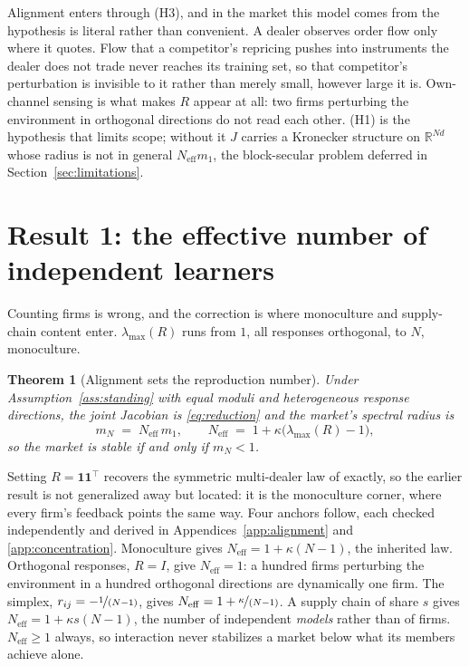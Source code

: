 \documentclass{article}
\theoremstyle{plain}
\newtheorem{theorem}{Theorem}
\theoremstyle{definition}
\newcommand{\Neff}{N_{\mathrm{eff}}}
\newcommand{\mN}{m_N}
\newcommand{\lmax}{\lambda_{\max}}
\begin{document}
Alignment enters through (H3), and in the market this model comes from the hypothesis is literal rather than convenient. A dealer observes order flow only where it quotes. Flow that a competitor's repricing pushes into instruments the dealer does not trade never reaches its training set, so that competitor's perturbation is invisible to it rather than merely small, however large it is. Own-channel sensing is what makes $R$ appear at all: two firms perturbing the environment in orthogonal directions do not read each other. (H1) is the hypothesis that limits scope; without it $J$ carries a Kronecker structure on $\mathbb{R}^{Nd}$ whose radius is not in general $\Neff m_1$, the block-secular problem deferred in Section~\ref{sec:limitations}.

\section{Result 1: the effective number of independent learners}
\label{sec:alignment}

Counting firms is wrong, and the correction is where monoculture and supply-chain content enter. $\lmax(R)$ runs from $1$, all responses orthogonal, to $N$, monoculture.

\begin{theorem}[Alignment sets the reproduction number]
\label{thm:alignment}
Under Assumption~\ref{ass:standing} with equal moduli and heterogeneous response directions, the joint Jacobian is \eqref{eq:reduction} and the market's spectral radius is
\begin{equation}
\mN \;=\; \Neff\, m_1, \qquad \Neff \;=\; 1 + \kappa\bigl(\lmax(R) - 1\bigr),
\end{equation}
so the market is stable if and only if $\mN < 1$.
\end{theorem}

Setting $R = \mathbf{1}\mathbf{1}^{\top}$ recovers the symmetric multi-dealer law of \citet{reflex2026} exactly, so the earlier result is not generalized away but located: it is the monoculture corner, where every firm's feedback points the same way. Four anchors follow, each checked independently and derived in Appendices~\ref{app:alignment} and \ref{app:concentration}. Monoculture gives $\Neff = 1+\kappa(N-1)$, the inherited law. Orthogonal responses, $R=I$, give $\Neff = 1$: a hundred firms perturbing the environment in a hundred orthogonal directions are dynamically one firm. The simplex, $r_{ij} = -\nicefrac{1}{(N-1)}$, gives $\Neff = 1+\nicefrac{\kappa}{(N-1)}$. A supply chain of share $s$ gives $\Neff = 1+\kappa s(N-1)$, the number of independent \emph{models} rather than of firms. $\Neff \geq 1$ always, so interaction never stabilizes a market below what its members achieve alone.
\end{document}
